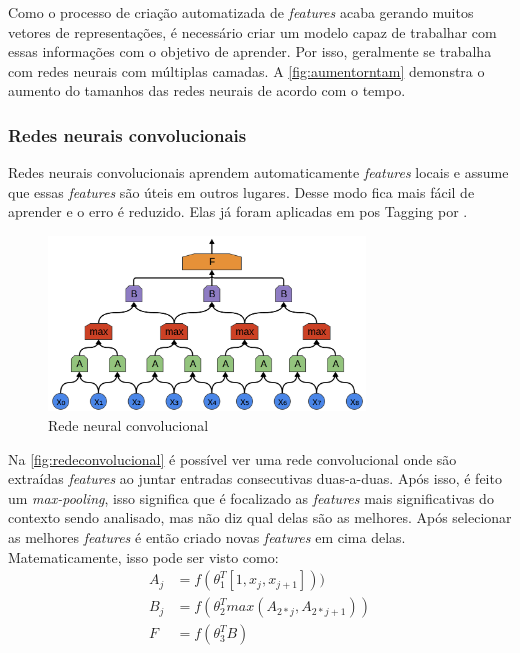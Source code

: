 Como o processo de criação automatizada de \textit{features} acaba gerando muitos vetores de representações, é necessário criar um modelo capaz de trabalhar com essas informações com o objetivo de aprender. Por isso, geralmente se trabalha com redes neurais com múltiplas camadas. A \autoref{fig:aumentorntam} demonstra o aumento do tamanhos das redes neurais de acordo com o tempo. 


\subsubsection{Redes neurais convolucionais}

Redes neurais convolucionais aprendem automaticamente \textit{features} locais e assume que essas \textit{features} são úteis em outros lugares. Desse modo fica mais fácil de aprender e o erro é reduzido. Elas já foram aplicadas em \ac{pos} Tagging por . 

\begin{figure}[!htb]
\centering
\caption{Rede neural convolucional} \label{fig:redeconvolucional}
\includegraphics[width=0.75\textwidth]{img/redeconvolucional.png}
\end{figure}

Na \autoref{fig:redeconvolucional} é possível ver uma rede convolucional onde são extraídas \textit{features} ao juntar entradas consecutivas duas-a-duas. Após isso, é feito um \textit{max-pooling}, isso significa que é focalizado as \textit{features} mais significativas do contexto sendo analisado, mas não diz qual delas são as melhores. Após selecionar as melhores \textit{features} é então criado novas \textit{features} em cima delas. Matematicamente, isso pode ser visto como:
\begin{align} \nonumber
A_j &= f(\theta_1^T [1, x_j, x_{j+1}])) \nonumber \\
B_j &= f(\theta_2^T max(A_{2*j}, A_{2*j+1})) \nonumber \\
F   &= f(\theta_3^T B) \nonumber
\end{align}

